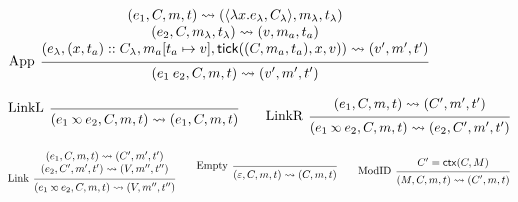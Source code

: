 \documentclass[acmsmall,review]{acmart}\settopmatter{printfolios=true,printccs=false,printacmref=false}
\theoremstyle{definition}
\newcommand*{\cons}{::}
\newcommand*{\mem}{m}
\newcommand*{\semarrow}{\rightsquigarrow}
\newcommand*{\semlink}{\mathbin{\rotatebox[origin=c]{180}{$\propto$}}}
\newcommand*{\link}[2]{{#1}\semlink{#2}}
\newcommand*{\tick}{\mathsf{tick}}
\newcommand*{\modctx}{\mathsf{ctx}}
\begin{document}
\begin{figure}[h!]
  \[
    \begin{prooftree}
      \hypo{
        \begin{matrix}
          (e_{1}, C, \mem, t)
          \semarrow
          (\langle\lambda x.e_{\lambda}, C_{\lambda}\rangle, \mem_{\lambda}, t_{\lambda}) \\
          (e_{2}, C, \mem_{\lambda}, t_{\lambda})
          \semarrow
          (v, \mem_{a}, t_{a})                                                            \\
          (e_{\lambda}, (x, t_{a})\cons C_{\lambda}, \mem_{a}[t_{a}\mapsto v], \tick((C,\mem_{a},t_{a}),x,v))
          \semarrow
          (v', \mem',t')
        \end{matrix}
      }
      \infer[left label={App}]1{
      (e_{1}\:e_{2}, C, \mem, t)
      \semarrow
      (v', \mem',t')
      }
    \end{prooftree}
  \]

  \[
    \begin{prooftree}
      \infer[left label=LinkL]0{
      (\link{e_{1}}{e_{2}}, C, \mem, t)
      \semarrow
      (e_{1}, C, \mem, t)
      }
    \end{prooftree}\qquad
    \begin{prooftree}
      \hypo{
        \begin{matrix}
          (e_{1}, C, \mem, t)
          \semarrow
          (C', \mem', t')
        \end{matrix}
      }
      \infer[left label=LinkR]1{
      (\link{e_{1}}{e_{2}}, C, \mem, t)
      \semarrow
      (e_{2}, C', \mem', t')
      }
    \end{prooftree}
  \]

  \[
    \begin{prooftree}
      \hypo{
        \begin{matrix}
          (e_{1}, C, \mem, t)
          \semarrow
          (C', \mem', t') \\
          (e_{2}, C', \mem', t')
          \semarrow
          (V, \mem'', t'')
        \end{matrix}
      }
      \infer[left label=Link]1{
      (\link{e_{1}}{e_{2}}, C, \mem, t)
      \semarrow
      (V, \mem'', t'')
      }
    \end{prooftree}\qquad
    \begin{prooftree}
      \infer[left label=Empty]0{
      (\varepsilon, C, \mem, t)
      \semarrow
      (C, \mem, t)
      }
    \end{prooftree}\qquad
    \begin{prooftree}
      \hypo{C'=\modctx(C,M)}
      \infer[left label=ModID]1{
      (M, C, \mem, t)
      \semarrow
      (C', \mem, t)
      }
    \end{prooftree}
  \]


\end{figure}
\end{document}
